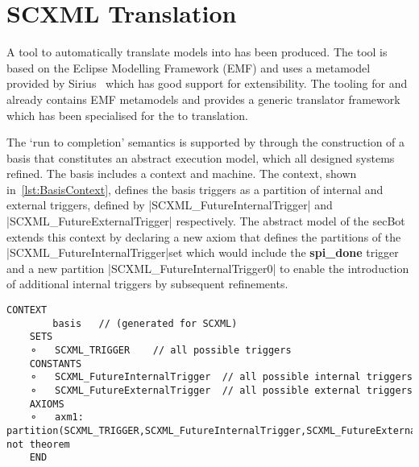 \section{SCXML Translation}
\label{sec:translation}

A tool to automatically translate \SCXML models into \iUMLB has been produced. 
The tool is based on the Eclipse Modelling Framework (EMF) and uses a \SCXML metamodel provided by Sirius~\cite{siriuswebsite} which has good support for extensibility. 
The tooling for \iUMLB and \EventB already contains EMF metamodels and provides a generic translator framework which has been specialised for the \SCXML to \iUMLB translation. 

The `run to completion' semantics is supported by \EventB through the construction of a basis that constitutes an 
abstract execution model, which all designed systems refined. The basis includes a \EventB context and machine. 
The context, shown in~\ref{lst:BasisContext}, defines the basis triggers as a partition of internal and external triggers, defined by |SCXML_FutureInternalTrigger| and |SCXML_FutureExternalTrigger| respectively. The abstract model of the secBot extends this context by declaring a new axiom that defines the partitions of the |SCXML_FutureInternalTrigger|set which would include the \textbf{spi\_done} trigger and a new partition |SCXML_FutureInternalTrigger0| to enable the introduction of additional internal triggers by subsequent refinements. 

\begin{lstlisting}[caption={Context for abstract basis},label={lst:BasisContext}, language=Event-B, escapechar=|]
	CONTEXT
		basis 	// (generated for SCXML)
	SETS
	⚬	SCXML_TRIGGER	 // all possible triggers
	CONSTANTS
	⚬	SCXML_FutureInternalTrigger	 // all possible internal triggers
	⚬	SCXML_FutureExternalTrigger	 // all possible external triggers  
	AXIOMS
	⚬	axm1:	partition(SCXML_TRIGGER,SCXML_FutureInternalTrigger,SCXML_FutureExternalTrigger) not theorem 
	END
\end{lstlisting}	

